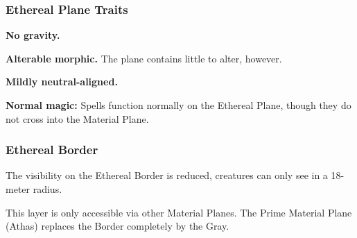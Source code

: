 

\subsubsection{Ethereal Plane Traits}
\begin{itemize*}
\item \textbf{No gravity.}
\item \textbf{Alterable morphic.} The plane contains little to alter, however.
\item \textbf{Mildly neutral-aligned.}
\item \textbf{Normal magic:} Spells function normally on the Ethereal Plane, though they do not cross into the Material Plane.
\end{itemize*}

\subsubsection{Ethereal Border}
The visibility on the Ethereal Border is reduced, creatures can only see in a 18-meter radius.

This layer is only accessible via other Material Planes. The Prime Material Plane (Athas) replaces the Border completely by the Gray.



